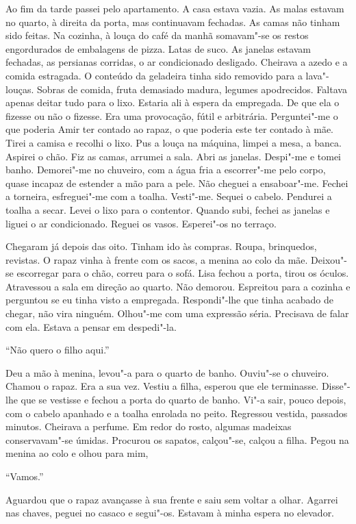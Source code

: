 Ao fim da tarde passei pelo apartamento. A casa estava vazia. As malas
estavam no quarto, à direita da porta, mas continuavam fechadas. As
camas não tinham sido feitas. Na cozinha, à louça do café da manhã
somavam"-se os restos engordurados de embalagens de pizza. Latas de suco.
As janelas estavam fechadas, as persianas corridas, o ar condicionado
desligado. Cheirava a azedo e a comida estragada. O conteúdo da
geladeira tinha sido removido para a lava"-louças. Sobras de comida,
fruta demasiado madura, legumes apodrecidos. Faltava apenas deitar tudo
para o lixo. Estaria ali à espera da empregada. De que ela o fizesse ou
não o fizesse. Era uma provocação, fútil e arbitrária. Perguntei"-me o
que poderia Amir ter contado ao rapaz, o que poderia este ter contado à
mãe. Tirei a camisa e recolhi o lixo. Pus a louça na máquina, limpei a
mesa, a banca. Aspirei o chão. Fiz as camas, arrumei a sala. Abri as
janelas. Despi"-me e tomei banho. Demorei"-me no chuveiro, com a água
fria a escorrer"-me pelo corpo, quase incapaz de estender a mão para a
pele. Não cheguei a ensaboar"-me. Fechei a torneira, esfreguei"-me com a
toalha. Vesti"-me. Sequei o cabelo. Pendurei a toalha a secar. Levei o
lixo para o contentor. Quando subi, fechei as janelas e liguei o ar
condicionado. Reguei os vasos. Esperei"-os no terraço.

Chegaram já depois das oito. Tinham ido às compras. Roupa, brinquedos,
revistas. O rapaz vinha à frente com os sacos, a menina ao colo da mãe.
Deixou"-se escorregar para o chão, correu para o sofá. Lisa fechou a
porta, tirou os óculos. Atravessou a sala em direção ao quarto. Não
demorou. Espreitou para a cozinha e perguntou se eu tinha visto a
empregada. Respondi"-lhe que tinha acabado de chegar, não vira ninguém.
Olhou"-me com uma expressão séria. Precisava de falar com ela. Estava a
pensar em despedi"-la.

``Não quero o filho aqui.''

Deu a mão à menina, levou"-a para o quarto de banho. Ouviu"-se o
chuveiro. Chamou o rapaz. Era a sua vez. Vestiu a filha, esperou que ele
terminasse. Disse"-lhe que se vestisse e fechou a porta do quarto de
banho. Vi"-a sair, pouco depois, com o cabelo apanhado e a toalha
enrolada no peito. Regressou vestida, passados minutos. Cheirava a
perfume. Em redor do rosto, algumas madeixas conservavam"-se úmidas.
Procurou os sapatos, calçou"-se, calçou a filha. Pegou na menina ao colo
e olhou para mim,

``Vamos.''

Aguardou que o rapaz avançasse à sua frente e saiu sem voltar a olhar.
Agarrei nas chaves, peguei no casaco e segui"-os. Estavam à minha espera
no elevador.

